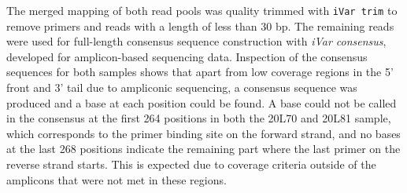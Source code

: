The merged mapping of both read pools was quality trimmed with \texttt{iVar trim} to remove primers and reads with a length of less than 30 bp. The remaining reads were used for full-length consensus sequence construction with \textit{iVar consensus}, developed for amplicon-based sequencing data. Inspection of the consensus sequences for both samples shows that apart from low coverage regions in the 5' front and 3' tail due to ampliconic sequencing, a consensus sequence was produced and a base at each position could be found. A base could not be called in the consensus at the first 264 positions in both the 20L70 and 20L81 sample, which corresponds to the primer binding site on the forward strand, and no bases at the last 268 positions indicate the remaining part where the last primer on the reverse strand starts. This is expected due to coverage criteria outside of the amplicons that were not met in these regions.\\
